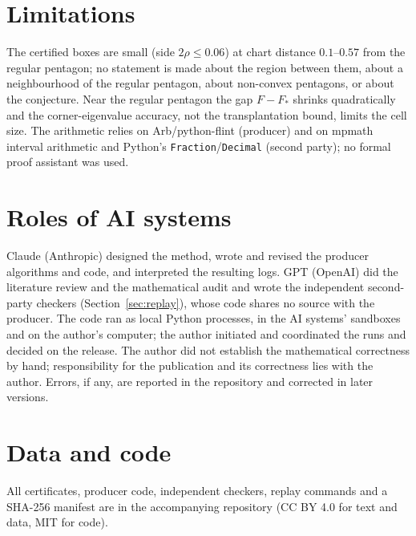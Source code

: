 \documentclass[11pt]{article}
\theoremstyle{remark}
\begin{document}
\section{Limitations}
The certified boxes are small (side $2\rho\le0.06$) at chart distance $0.1$--$0.57$ from the regular pentagon; no statement is made about the region between them,
about a neighbourhood of the regular pentagon, about non-convex pentagons, or about the conjecture. Near the regular
pentagon the gap $F-F_*$ shrinks quadratically and the corner-eigenvalue accuracy, not the transplantation bound,
limits the cell size. The arithmetic relies on Arb/python-flint \cite{arb} (producer) and on mpmath interval arithmetic
and Python's \texttt{Fraction}/\texttt{Decimal} (second party); no formal proof assistant was used.

\section{Roles of AI systems}\label{sec:ai}
Claude (Anthropic) designed the method, wrote and revised the producer algorithms and code, and interpreted the
resulting logs. GPT (OpenAI) did the literature review and the mathematical audit and wrote the independent
second-party checkers (Section~\ref{sec:replay}), whose code shares no source with the producer. The code ran as
local Python processes, in the AI systems' sandboxes and on the author's computer; the author initiated and
coordinated the runs and decided on the release. The author did not establish the mathematical correctness by hand;
responsibility for the publication and its correctness lies with the author. Errors, if any, are reported in the
repository and corrected in later versions.

\section*{Data and code}
All certificates, producer code, independent checkers, replay commands and a SHA-256 manifest are in the accompanying
repository (CC BY 4.0 for text and data, MIT for code).
\end{document}
